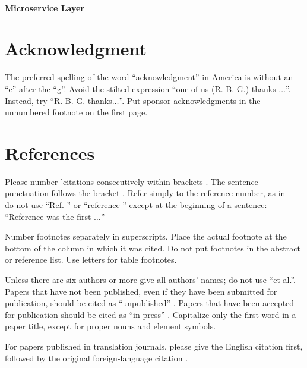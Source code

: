 \documentclass[conference]{IEEEtran}
\begin{document}
\paragraph{Microservice Layer}
\section*{Acknowledgment}

The preferred spelling of the word ``acknowledgment'' in America is without 
an ``e'' after the ``g''. Avoid the stilted expression ``one of us (R. B. 
G.) thanks $\ldots$''. Instead, try ``R. B. G. thanks$\ldots$''. Put sponsor 
acknowledgments in the unnumbered footnote on the first page.

\section*{References}

Please number 'citations consecutively within brackets . The 
sentence punctuation follows the bracket . Refer simply to the reference 
number, as in ---do not use ``Ref. '' or ``reference '' except at 
the beginning of a sentence: ``Reference  was the first $\ldots$''

Number footnotes separately in superscripts. Place the actual footnote at 
the bottom of the column in which it was cited. Do not put footnotes in the 
abstract or reference list. Use letters for table footnotes.

Unless there are six authors or more give all authors' names; do not use 
``et al.''. Papers that have not been published, even if they have been 
submitted for publication, should be cited as ``unpublished'' . Papers 
that have been accepted for publication should be cited as ``in press'' . 
Capitalize only the first word in a paper title, except for proper nouns and 
element symbols.

For papers published in translation journals, please give the English 
citation first, followed by the original foreign-language citation .



\end{document}

